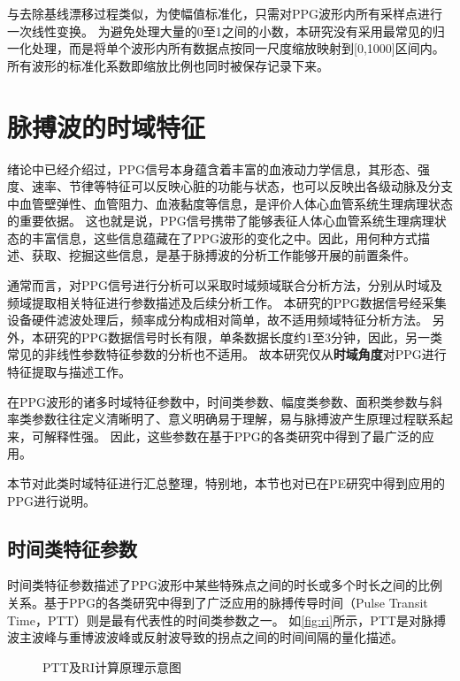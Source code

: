 与去除基线漂移过程类似，为使幅值标准化，只需对PPG波形内所有采样点进行一次线性变换。
为避免处理大量的0至1之间的小数，本研究没有采用最常见的归一化处理，而是将单个波形内所有数据点按同一尺度缩放映射到[0,1000]区间内。
所有波形的标准化系数即缩放比例也同时被保存记录下来。

\section{脉搏波的时域特征}
绪论中已经介绍过，PPG信号本身蕴含着丰富的血液动力学信息，其形态、强度、速率、节律等特征可以反映心脏的功能与状态，也可以反映出各级动脉及分支中血管壁弹性、血管阻力、血液黏度等信息，是评价人体心血管系统生理病理状态的重要依据\cite{PPGYY}。
这也就是说，PPG信号携带了能够表征人体心血管系统生理病理状态的丰富信息，这些信息蕴藏在了PPG波形的变化之中。因此，用何种方式描述、获取、挖掘这些信息，是基于脉搏波的分析工作能够开展的前置条件。

通常而言，对PPG信号进行分析可以采取时域频域联合分析方法，分别从时域及频域提取相关特征进行参数描述及后续分析工作。
本研究的PPG数据信号经采集设备硬件滤波处理后，频率成分构成相对简单，故不适用频域特征分析方法。
另外，本研究的PPG数据信号时长有限，单条数据长度约1至3分钟，因此，另一类常见的非线性参数特征参数的分析也不适用。
故本研究仅从\textbf{时域角度}对PPG进行特征提取与描述工作。

在PPG波形的诸多时域特征参数中，时间类参数、幅度类参数、面积类参数与斜率类参数往往定义清晰明了、意义明确易于理解，易与脉搏波产生原理过程联系起来，可解释性强。
因此，这些参数在基于PPG的各类研究中得到了最广泛的应用\cite{cwl,mmt}。

本节对此类时域特征进行汇总整理，特别地，本节也对已在PE研究中得到应用的PPG进行说明。

\subsection{时间类特征参数}
时间类特征参数描述了PPG波形中某些特殊点之间的时长或多个时长之间的比例关系。基于PPG的各类研究中得到了广泛应用的脉搏传导时间（Pulse Transit Time，PTT）则是最有代表性的时间类参数之一\cite{Brumfield2005,Su2014}。
如\autoref{fig:ri}所示，PTT是对脉搏波主波峰与重博波波峰或反射波导致的拐点之间的时间间隔的量化描述。
\begin{figure}[htbp]
    \centering
    \quad
    \caption[PTT及RI计算原理示意图]{\label{fig:ri}PTT及RI计算原理示意图\cite{Su2014}}
\end{figure}

